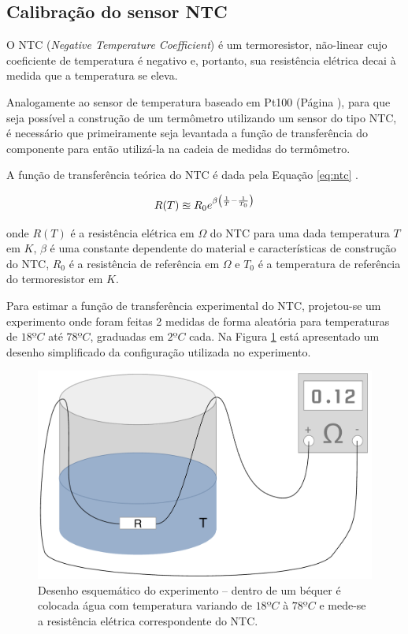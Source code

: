 \documentclass[a4paper]{instrumentacao}
\begin{document}
\subsection{Calibração do sensor NTC}
O NTC (\textit{Negative Temperature Coefficient}) é um termoresistor, não-linear cujo coeficiente de temperatura é negativo e, portanto, sua resistência elétrica decai à medida que a temperatura se eleva.

Analogamente ao sensor de temperatura baseado em Pt100 (Página \pageref{ch:pt100}), para que seja possível a construção de um termômetro utilizando um sensor do tipo NTC, é necessário que primeiramente seja levantada a função de transferência do componente para então utilizá-la na cadeia de medidas do termômetro.

A função de transferência teórica do NTC é dada pela Equação \ref{eq:ntc} \cite{livro-texto}.

\begin{equation}
	\large
	R(T) \approxeq R_0 e^{\beta\left(\frac{1}{T} - \frac{1}{T_0}\right)}
	\label{eq:ntc}
\end{equation}

\noindent
onde $R(T)$ é a resistência elétrica em $\Omega$ do NTC para uma dada temperatura $T$ em $K$, $\beta$ é uma constante dependente do material e características de construção do NTC, $R_0$ é a resistência de referência em $\Omega$ e $T_0$ é a temperatura de referência do termoresistor em $K$.

Para estimar a função de transferência experimental do NTC, projetou-se um experimento onde foram feitas 2 medidas de forma aleatória para temperaturas de $18ºC$ até $78ºC$, graduadas em $2ºC$ cada. Na Figura \ref{fig:ntc-esquematico} está apresentado um desenho simplificado da configuração utilizada no experimento.

\begin{figure}[H]
\center
\includegraphics[width=\textwidth]{Bequer.pdf}
\caption{Desenho esquemático do experimento -- dentro de um béquer é colocada água com temperatura variando de $18ºC$ à $78ºC$ e mede-se a resistência elétrica correspondente do NTC.}
\label{fig:ntc-esquematico}
\end{figure}
\end{document}
